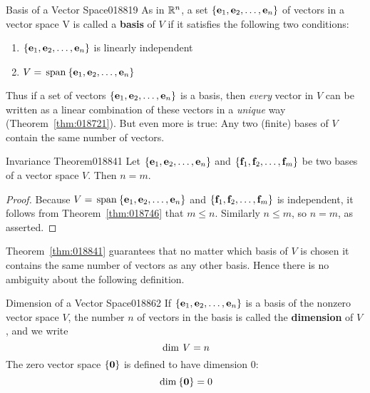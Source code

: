 \newpage
\begin{definition}{Basis of a Vector Space}{018819}
As in $\mathbb{R}^n$, a set $\{\textbf{e}_{1}, \textbf{e}_{2}, \dots, \textbf{e}_{n}\}$ of vectors in a vector space V is called a \textbf{basis} of $V$ if it satisfies the following two conditions:

\begin{enumerate}
\item $\{\textbf{e}_{1}, \textbf{e}_{2}, \dots, \textbf{e}_{n}\}$ is linearly independent

\item $V = \thinspace\operatorname{span\medspace}\{\textbf{e}_{1}, \textbf{e}_{2}, \dots, \textbf{e}_{n}\}$

\end{enumerate}
\end{definition}

\noindent Thus if a set of vectors $\{\textbf{e}_{1}, \textbf{e}_{2}, \dots, \textbf{e}_{n}\}$ is a basis, then \textit{every} vector in $V$ can be written as a linear combination of these vectors in a \textit{unique} way (Theorem~\ref{thm:018721}). But even more is true: Any two (finite) bases of $V$ contain the same number of vectors.

\begin{theorem}{Invariance Theorem}{018841}
Let $\{\textbf{e}_{1}, \textbf{e}_{2}, \dots, \textbf{e}_{n}\}$ and $\{\textbf{f}_{1}, \textbf{f}_{2}, \dots, \textbf{f}_{m}\}$ be two bases of a vector space $V$. Then $n = m$.
\end{theorem}

\begin{proof}
Because $V = \thinspace\operatorname{span\medspace}\{\textbf{e}_{1}, \textbf{e}_{2}, \dots, \textbf{e}_{n}\}$ and $\{\textbf{f}_{1}, \textbf{f}_{2}, \dots, \textbf{f}_{m}\}$ is independent, it follows from Theorem~\ref{thm:018746} that $m \leq n$. Similarly $n \leq m$, so $n = m$, as asserted.
\end{proof}

Theorem~\ref{thm:018841} guarantees that no matter which basis of $V$ is chosen it contains the same number of vectors as any other basis. Hence there is no ambiguity about the following definition.

\begin{definition}{Dimension of a Vector Space}{018862}
If $\{\textbf{e}_{1}, \textbf{e}_{2}, \dots, \textbf{e}_{n}\}$ is a basis of the nonzero vector space $V$, the number $n$ of vectors in the basis is called the \textbf{dimension} of $V$, and we write
\begin{equation*}
\thinspace\operatorname{dim \medspace} V = n
\end{equation*}
The zero vector space $\{\textbf{0}\}$ is defined to have dimension $0$:
\begin{equation*}
\thinspace\operatorname{dim \medspace}\{\textbf{0}\} = 0
\end{equation*}
\end{definition}

